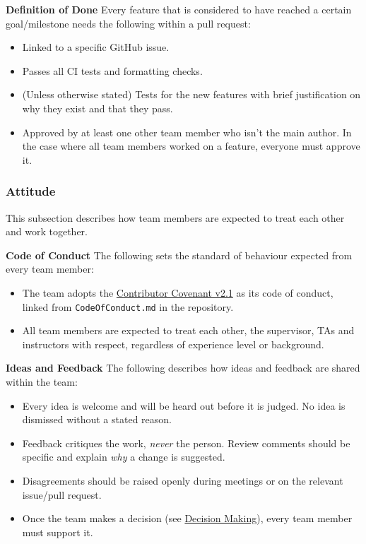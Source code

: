 \documentclass{article}
\begin{document}
\textbf{Definition of Done} \newline
Every feature that is considered to have reached a certain goal/milestone needs the following within a pull request:
\begin{itemize}
    \item Linked to a specific GitHub issue.
    \item Passes all CI tests and formatting checks.
    \item (Unless otherwise stated) Tests for the new features with brief justification on why they exist and that they pass.
    \item Approved by at least one other team member who isn't the main author. In the case where all team members worked on a feature, everyone must approve it.
\end{itemize}

\subsubsection*{Attitude}

This subsection describes how team members are expected to treat each other and work together.

\textbf{Code of Conduct} \newline
The following sets the standard of behaviour expected from every team member:
\begin{itemize}
    \item The team adopts the \href{https://www.contributor-covenant.org/version/2/1/code_of_conduct/}{Contributor Covenant v2.1}
    as its code of conduct, linked from \texttt{CodeOfConduct.md} in the repository.
    \item All team members are expected to treat each other, the supervisor, TAs and
    instructors with respect, regardless of experience level or background.
\end{itemize}

\textbf{Ideas and Feedback} \newline
The following describes how ideas and feedback are shared within the team:
\begin{itemize}
    \item Every idea is welcome and will be heard out before it is judged. No idea is dismissed without a stated reason.
    \item Feedback critiques the work, \emph{never} the person. Review comments should be specific and explain \emph{why} a change is suggested.
    \item Disagreements should be raised openly during meetings or on the relevant issue/pull request.
    \item Once the team makes a decision (see \hyperref[sec:decision-making]{Decision Making}), every team member must support it.
\end{itemize}
\end{document}
